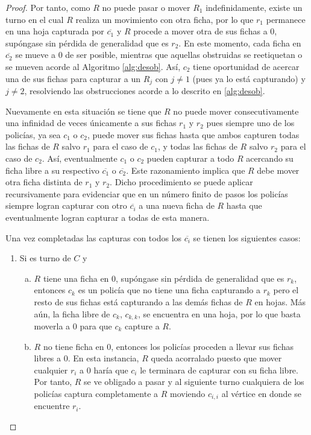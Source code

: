 \begin{proof}
    Por tanto, como $R$ no puede pasar o mover $R_1$ indefinidamente, existe un
    turno en el cual $R$ realiza un movimiento con otra ficha, por lo que $r_1$
    permanece en una hoja capturada por $\overline{c_1}$ y $R$ procede a mover
    otra de sus fichas a $0$, sup\'ongase sin p\'erdida de generalidad que es
    $r_2$. En este momento, cada ficha en $\overline{c_2}$ se mueve a $0$ de ser
    posible, mientras que aquellas obstruidas se reetiquetan o se mueven acorde
    al Algoritmo \cref{alg:desob}. As\'i, $c_2$ tiene oportunidad de acercar una
    de sus fichas para capturar a un $R_j$ con $j\neq 1$ (pues ya lo est\'a
    capturando) y $j\neq 2$, resolviendo las obstrucciones acorde a lo descrito
    en \cref{alg:desob}.

    Nuevamente en esta situaci\'on se tiene que $R$ no puede mover
    consecutivamente una infinidad de veces \'unicamente a sus fichas $r_1$ y
    $r_2$ pues siempre uno de los polic\'ias, ya sea $c_1$ o $c_2$, puede mover
    sus fichas hasta que ambos capturen todas las fichas de $R$ salvo $r_1$ para
    el caso de $c_1$, y todas las fichas de $R$ salvo $r_2$ para el caso de
    $c_2$. As\'i, eventualmente $c_1$ o $c_2$ pueden capturar a todo $R$
    acercando su ficha libre a su respectivo $\overline{c_1}$ o
    $\overline{c_2}$. Este razonamiento implica que $R$ debe mover otra ficha
    distinta de $r_1$ y $r_2$. Dicho procedimiento se puede aplicar
    recursivamente para evidenciar que en un n\'umero finito de pasos los
    polic\'ias siempre logran capturar con otro $\overline{c_i}$ a una nueva
    ficha de $R$ hasta que eventualmente logran capturar a todas de esta manera.

    Una vez completadas las capturas con todos los $\overline{c_i}$ se tienen
    los siguientes casos:
    \begin{enumerate}
        \item Si es turno de $C$ y
        \begin{enumerate}[(a)]
            \item $R$ tiene una ficha en $0$, sup\'ongase sin p\'erdida de
            generalidad que es $r_k$, entonces $c_k$ es un polic\'ia que no
            tiene una ficha capturando a $r_k$ pero el resto de sus fichas
            est\'a capturando a las dem\'as fichas de $R$ en hojas. M\'as a\'un,
            la ficha libre de $c_k$, $c_{k,k}$, se encuentra en una hoja, por lo
            que basta moverla a $0$ para que $c_k$ capture a $R$.

            \item $R$ no tiene ficha en $0$, entonces los polic\'ias proceden a
            llevar sus fichas libres a $0$. En esta instancia, $R$ queda
            acorralado puesto que mover cualquier $r_i$ a $0$ har\'ia que $c_i$
            le terminara de capturar con su ficha libre. Por tanto, $R$ se ve
            obligado a pasar y al siguiente turno cualquiera de los polic\'ias
            captura completamente a $R$ moviendo $c_{i,i}$ al v\'ertice en donde
            se encuentre $r_i$.
        \end{enumerate}


\end{enumerate}
\end{proof}
